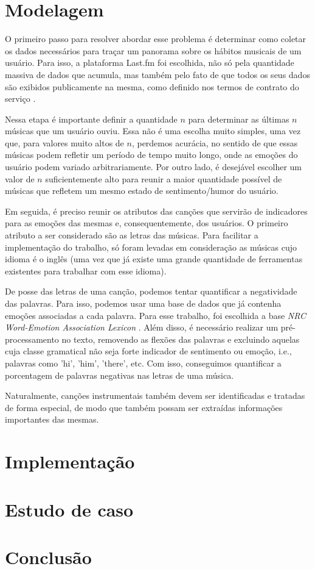 \section{Modelagem}

O primeiro passo para resolver abordar esse problema é determinar como coletar os dados necessários para traçar um panorama sobre os hábitos
musicais de um usuário. Para isso, a plataforma Last.fm foi escolhida,
não só pela quantidade massiva de dados que acumula, mas também pelo
fato de que todos os seus dados são exibidos publicamente na mesma,
como definido nos termos de contrato do serviço \cite{Lastfmterms}.

Nessa etapa é importante definir a quantidade $ n $ para determinar
 as últimas $ n $ músicas que um usuário ouviu. Essa não é uma escolha
 muito simples, uma vez que, para valores muito altos de $ n $, perdemos
 acurácia, no sentido de que essas músicas podem refletir um período de
 tempo muito longo, onde as emoções do usuário podem variado 
 arbitrariamente. Por outro lado, é desejável escolher um valor de $ n $
 suficientemente alto para reunir a maior quantidade possível de músicas
 que refletem um mesmo estado de sentimento/humor do usuário.

Em seguida, é preciso reunir os atributos das canções que servirão de 
indicadores para as emoções das mesmas e, consequentemente, dos usuários.
O primeiro atributo a ser considerado são as letras das músicas. Para 
facilitar a implementação do trabalho, só foram levadas em consideração
as músicas cujo idioma é o inglês (uma vez que já existe uma grande
quantidade de ferramentas existentes para trabalhar com esse idioma).

De posse das letras de uma canção, podemos tentar quantificar a negatividade
das palavras. Para isso, podemos usar uma base de dados que já contenha
emoções associadas a cada palavra. Para esse trabalho, foi escolhida
a base \textit{NRC Word-Emotion Association Lexicon}
\cite{Mohammad13}. Além disso, é necessário realizar um pré-processamento
no texto, removendo as flexões das palavras e excluindo aquelas cuja
classe gramatical não seja forte indicador de sentimento ou emoção, i.e.,
palavras como 'hi', 'him', 'there', etc. Com isso, conseguimos quantificar
a porcentagem de palavras negativas nas letras de uma música.

Naturalmente, canções instrumentais também devem ser identificadas
e tratadas de forma especial, de modo que também possam ser extraídas 
informações importantes das mesmas.

\section{Implementação}



\section{Estudo de caso}



\section{Conclusão}
